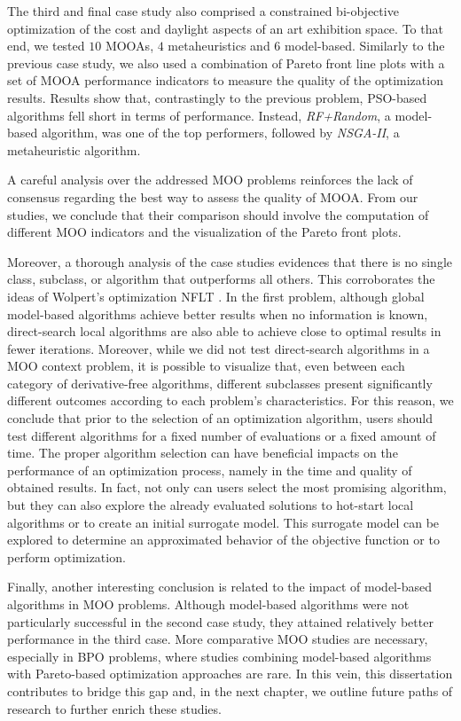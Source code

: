 The third and final case study also comprised a constrained bi-objective optimization of the cost and daylight aspects of an art exhibition space. To that end, we tested $10$ \acp{MOOA}, $4$ metaheuristics and $6$ model-based. Similarly to the previous case study, we also used a combination of Pareto front line plots with a set of \ac{MOOA} performance indicators to measure the quality of the optimization results. Results show that, contrastingly to the previous problem, \ac{PSO}-based algorithms fell short in terms of performance. Instead, \textit{RF+Random}, a model-based algorithm, was one of the top performers, followed by \textit{NSGA-II}, a metaheuristic algorithm. 

A careful analysis over the addressed \ac{MOO} problems reinforces the lack of consensus regarding the best way to assess the quality of \ac{MOOA}. From our studies, we conclude that their comparison should involve the computation of different \ac{MOO} indicators and the visualization of the Pareto front plots. %

Moreover, a thorough analysis of the case studies evidences that there is no single class, subclass, or algorithm that outperforms all others. This corroborates the ideas of Wolpert's optimization \ac{NFLT} \cite{Wolpert1997NFLT}. In the first problem, although global model-based algorithms achieve better results when no information is known, direct-search local algorithms are also able to achieve close to optimal results in fewer iterations. Moreover, while we did not test direct-search algorithms in a \ac{MOO} context problem, it is possible to visualize that, even between each category of derivative-free algorithms, %
different subclasses present significantly different outcomes according to each problem's characteristics. For this reason, we conclude that prior to the selection of an optimization algorithm, users should test different algorithms for a fixed number of evaluations or a fixed amount of time. The proper algorithm selection can have beneficial impacts on the performance of an optimization process, namely in the time and quality of obtained results. In fact, not only can users select the most promising algorithm, but they can also explore the already evaluated solutions to hot-start local algorithms or to create an initial surrogate model. This surrogate model can be explored to determine an approximated behavior of the objective function or to perform optimization. 

Finally, another interesting conclusion is related to the impact of model-based algorithms in \ac{MOO} problems. Although model-based algorithms were not particularly successful in the second case study, they attained relatively better performance in the third case. More comparative \ac{MOO} studies are necessary, especially in \ac{BPO} problems, where studies combining model-based algorithms with Pareto-based optimization approaches are rare. In this vein, this dissertation contributes to bridge this gap and, in the next chapter, we outline future paths of research to further enrich these studies.